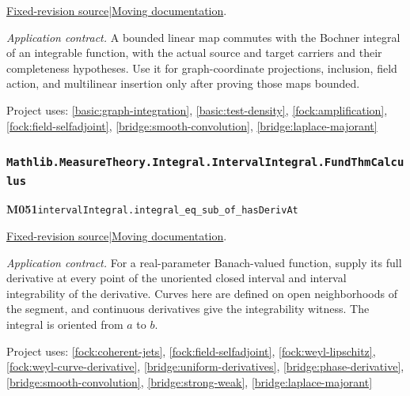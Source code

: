 \documentclass[11pt,a4paper]{article}
\theoremstyle{definition}
\theoremstyle{remark}
\begin{document}
\href{https://github.com/leanprover-community/mathlib4/blob/9bac2d0692944a775113f7c130fd5e5b4608a854/Mathlib/MeasureTheory/Integral/Bochner/ContinuousLinearMap.lean}{Fixed-revision source}\quad|\quad\href{https://leanprover-community.github.io/mathlib4_docs/Mathlib/MeasureTheory/Integral/Bochner/ContinuousLinearMap.html#ContinuousLinearMap.integral_comp_comm}{Moving documentation}.\par
\noindent\textit{Application contract.} A bounded linear map commutes with the Bochner integral of an integrable function, with the actual source and target carriers and their completeness hypotheses. Use it for graph-coordinate projections, inclusion, field action, and multilinear insertion only after proving those maps bounded.\par
{\small Project uses: \ref{basic:graph-integration}, \ref{basic:test-density}, \ref{fock:amplification}, \ref{fock:field-selfadjoint}, \ref{bridge:smooth-convolution}, \ref{bridge:laplace-majorant}}\par\medskip

\subsubsection*{\nolinkurl{Mathlib.MeasureTheory.Integral.IntervalIntegral.FundThmCalculus}}
\noindent\textbf{M051}\label{base:M051}\quad\nolinkurl{intervalIntegral.integral_eq_sub_of_hasDerivAt}

\href{https://github.com/leanprover-community/mathlib4/blob/9bac2d0692944a775113f7c130fd5e5b4608a854/Mathlib/MeasureTheory/Integral/IntervalIntegral/FundThmCalculus.lean}{Fixed-revision source}\quad|\quad\href{https://leanprover-community.github.io/mathlib4_docs/Mathlib/MeasureTheory/Integral/IntervalIntegral/FundThmCalculus.html#intervalIntegral.integral_eq_sub_of_hasDerivAt}{Moving documentation}.\par
\noindent\textit{Application contract.} For a real-parameter Banach-valued function, supply its full derivative at every point of the unoriented closed interval and interval integrability of the derivative. Curves here are defined on open neighborhoods of the segment, and continuous derivatives give the integrability witness. The integral is oriented from $a$ to $b$.\par
{\small Project uses: \ref{fock:coherent-jets}, \ref{fock:field-selfadjoint}, \ref{fock:weyl-lipschitz}, \ref{fock:weyl-curve-derivative}, \ref{bridge:uniform-derivatives}, \ref{bridge:phase-derivative}, \ref{bridge:smooth-convolution}, \ref{bridge:strong-weak}, \ref{bridge:laplace-majorant}}\par\medskip
\end{document}

